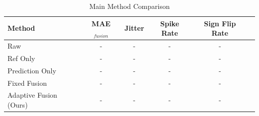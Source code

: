 
\begin{table}[t]
\centering
\caption{Main Method Comparison}
\label{tab:main_comparison}
\begin{tabular}{lccccc}
\hline
\textbf{Method} & \textbf{MAE$_{fusion}$} & \textbf{Jitter} & \textbf{Spike Rate} & \textbf{Sign Flip Rate} \\
\hline
Raw & - & - & - & - \\
Ref Only & - & - & - & - \\
Prediction Only & - & - & - & - \\
Fixed Fusion & - & - & - & - \\
Adaptive Fusion (Ours) & - & - & - & - \\
\hline
\end{tabular}
\end{table}
